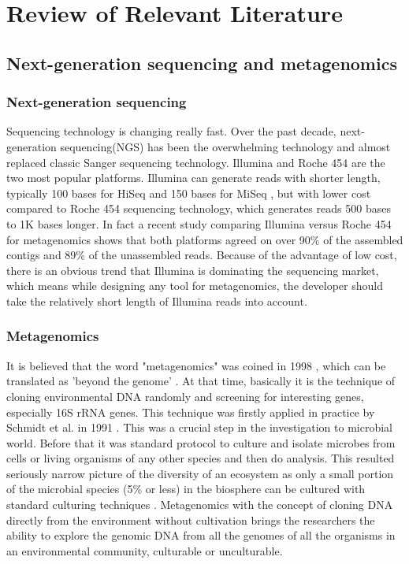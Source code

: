 \chapter{Review of Relevant Literature}

\section{Next-generation sequencing and metagenomics}

\subsection{Next-generation sequencing}
Sequencing technology is changing really fast. Over the past decade, next-generation sequencing(NGS)
 has been the overwhelming technology and almost replaced classic Sanger sequencing technology. 
 Illumina and Roche 454 are the two most popular platforms. Illumina can generate reads with shorter
 length, typically 100 bases for HiSeq and 150 bases for MiSeq \cite{Qin:2010aa, Mason:2012aa},   
 but with lower cost compared to Roche 454 sequencing technology, 
 which generates reads 500 bases to 1K bases longer. In fact a recent study comparing Illumina versus Roche 454 for metagenomics
 shows that both platforms agreed on over 90\% of the assembled contigs and 89\% of the unassembled reads\cite{Luo:2012aa}.
Because of the advantage of low cost, there is an obvious trend that Illumina is dominating the sequencing market, which 
means while designing any tool for metagenomics, the developer should take the relatively short length of Illumina reads
 into account.


\subsection{Metagenomics}
It is believed that the word "metagenomics" was coined in 1998 \cite{Handelsman:1998aa},
 which can be translated as 'beyond the genome' \cite{Gilbert:2011aa}. At that time, basically
 it is the technique of cloning environmental DNA randomly and screening for interesting genes, 
 especially 16S rRNA genes. This technique was firstly applied in practice by Schmidt et al. in 1991 \cite{Schmidt:1991aa}.
 This was a crucial step in the investigation to microbial world. Before that it was standard 
 protocol to culture and isolate microbes from cells or living organisms of any other species and 
 then do analysis. This resulted seriously narrow picture of the diversity of an ecosystem as only a
 small portion of the microbial species (5\% or less) in the biosphere can be cultured with standard culturing techniques \cite{Sogin:2006aa}.
 Metagenomics with the concept of cloning DNA directly from the environment without cultivation 
 brings the researchers the ability to explore the genomic DNA from all the genomes of all the organisms in an environmental
 community, culturable or unculturable.
 
